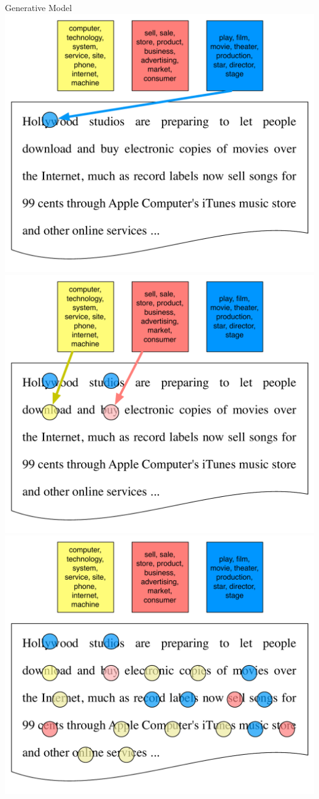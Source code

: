 \begin{frame}{Generative Model}
	\only<4> {   \includegraphics[width=.8\linewidth]{topic_models/inference_1}  }
	\only<5> {   \includegraphics[width=.8\linewidth]{topic_models/inference_2}  }
	\only<6> {   \includegraphics[width=.8\linewidth]{topic_models/inference_3}  }
\end{frame}

